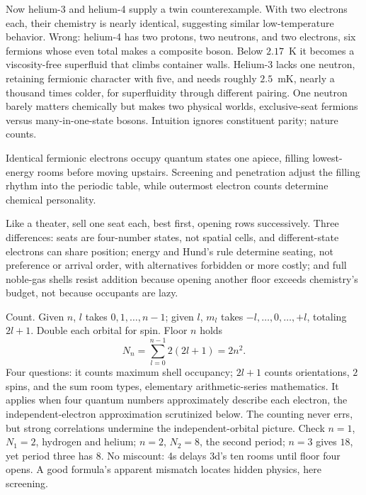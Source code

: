 Now helium-3 and helium-4 supply a twin counterexample. With two electrons each, their chemistry is nearly identical, suggesting similar low-temperature behavior. Wrong: helium-4 has two protons, two neutrons, and two electrons, six fermions whose even total makes a composite boson. Below \(2.17\)~K it becomes a viscosity-free superfluid that climbs container walls. Helium-3 lacks one neutron, retaining fermionic character with five, and needs roughly \(2.5\)~mK, nearly a thousand times colder, for superfluidity through different pairing. One neutron barely matters chemically but makes two physical worlds, exclusive-seat fermions versus many-in-one-state bosons. Intuition ignores constituent parity; nature counts.


\begin{oneline}
Identical fermionic electrons occupy quantum states one apiece, filling lowest-energy rooms before moving upstairs. Screening and penetration adjust the filling rhythm into the periodic table, while outermost electron counts determine chemical personality.
\end{oneline}

Like a theater, sell one seat each, best first, opening rows successively. Three differences: seats are four-number states, not spatial cells, and different-state electrons can share position; energy and Hund's rule determine seating, not preference or arrival order, with alternatives forbidden or more costly; and full noble-gas shells resist addition because opening another floor exceeds chemistry's budget, not because occupants are lazy.


Count. Given \(n\), \(l\) takes \(0,1,\dots,n-1\); given \(l\), \(m_l\) takes \(-l,\dots,0,\dots,+l\), totaling \(2l+1\). Double each orbital for spin. Floor \(n\) holds
\[
N_n=\sum_{l=0}^{n-1}2(2l+1)=2n^2 .
\]
Four questions: it counts maximum shell occupancy; \(2l+1\) counts orientations, \(2\) spins, and the sum room types, elementary arithmetic-series mathematics. It applies when four quantum numbers approximately describe each electron, the independent-electron approximation scrutinized below. The counting never errs, but strong correlations undermine the independent-orbital picture. Check \(n=1\), \(N_1=2\), hydrogen and helium; \(n=2\), \(N_2=8\), the second period; \(n=3\) gives \(18\), yet period three has \(8\). No miscount: 4s delays 3d's ten rooms until floor four opens. A good formula's apparent mismatch locates hidden physics, here screening.

